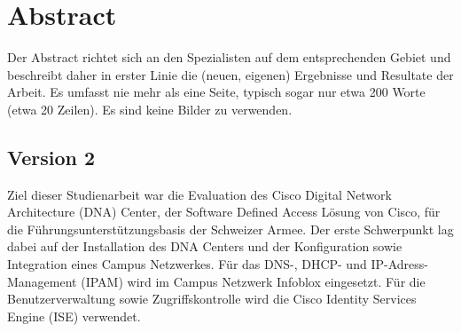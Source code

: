 \section{Abstract}
Der Abstract richtet sich an den Spezialisten auf dem entsprechenden Gebiet und 
beschreibt daher in erster Linie die (neuen, eigenen) Ergebnisse und Resultate der 
Arbeit. Es umfasst nie mehr als eine Seite, typisch sogar nur etwa 200 Worte (etwa 
20 Zeilen). Es sind keine Bilder zu verwenden.

\subsection{Version 2}

Ziel dieser Studienarbeit war die Evaluation des Cisco Digital Network Architecture (DNA) Center, der Software Defined Access Lösung von Cisco, für die Führungsunterstützungsbasis der Schweizer Armee. Der erste Schwerpunkt lag dabei auf der Installation des DNA Centers und der Konfiguration sowie Integration eines Campus Netzwerkes. Für das DNS-, DHCP- und IP-Adress-Management (IPAM) wird im Campus Netzwerk Infoblox eingesetzt. Für die Benutzerverwaltung sowie Zugriffskontrolle wird die Cisco Identity Services Engine (ISE) verwendet.

